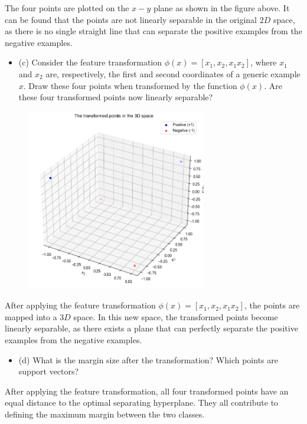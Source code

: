 \documentclass[11pt]{article}
\begin{document}
	
	The four points are plotted on the $x-y$ plane as shown in the figure above. It can be found that the points are not linearly separable in the original $2D$ space, as there is no single straight line that can separate the positive examples from the negative examples.
	
	\begin{itemize}
		\item (c) Consider the feature transformation $\phi(x)=\left[x_{1}, x_{2}, x_{1} x_{2}\right]$, where $x_{1}$ and $x_{2}$ are, respectively, the first and second coordinates of a generic example $x$. Draw these four points when transformed by the function $\phi(x)$. Are these four transformed points now linearly separable?
	\end{itemize}
	
	
	\begin{figure}[H]
		\centering
		\includegraphics[width=0.7\textwidth]{figures/figure4.png}
	\end{figure}
	
	
	After applying the feature transformation $\phi(x)=\left[x_{1}, x_{2}, x_{1} x_{2}\right]$, the points are mapped into a $3D$ space. In this new space, the transformed points become linearly separable, as there exists a plane that can perfectly separate the positive examples from the negative examples.
	
	\begin{itemize}
		\item (d) What is the margin size after the transformation? Which points are support vectors?
	\end{itemize}
	
	After applying the feature transformation, all four transformed points have an equal distance to the optimal separating hyperplane. They all contribute to defining the maximum margin between the two classes.
	
\end{document}
